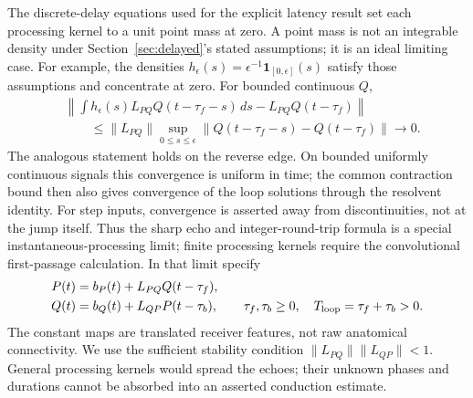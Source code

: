 The discrete-delay equations used for the explicit latency result set each processing kernel to a unit point mass at zero. A point mass is not an integrable density under Section~\ref{sec:delayed}'s stated assumptions; it is an ideal limiting case. For example, the densities $h_\epsilon(s)=\epsilon^{-1}\mathbf{1}_{[0,\epsilon]}(s)$ satisfy those assumptions and concentrate at zero. For bounded continuous $Q$,
\begin{align*}
&\left\|\int h_\epsilon(s)L_{PQ}Q(t-\tau_f-s)\,ds-L_{PQ}Q(t-\tau_f)\right\|\\
&\qquad\le\|L_{PQ}\|\sup_{0\le s\le\epsilon}\|Q(t-\tau_f-s)-Q(t-\tau_f)\|\longrightarrow0.
\end{align*}
The analogous statement holds on the reverse edge. On bounded uniformly continuous signals this convergence is uniform in time; the common contraction bound then also gives convergence of the loop solutions through the resolvent identity. For step inputs, convergence is asserted away from discontinuities, not at the jump itself. Thus the sharp echo and integer-round-trip formula is a special instantaneous-processing limit; finite processing kernels require the convolutional first-passage calculation. In that limit specify
\begin{align}
P(t)&=b_P(t)+L_{PQ}Q(t-\tau_f),\nonumber\\
Q(t)&=b_Q(t)+L_{QP}P(t-\tau_b),\qquad \tau_f,\tau_b\ge0,\quad T_{\rm loop}=\tau_f+\tau_b>0.\label{eq:reciprocal}
\end{align}
The constant maps are translated receiver features, not raw anatomical connectivity. We use the sufficient stability condition $\|L_{PQ}\|\|L_{QP}\|<1$. General processing kernels would spread the echoes; their unknown phases and durations cannot be absorbed into an asserted conduction estimate.

